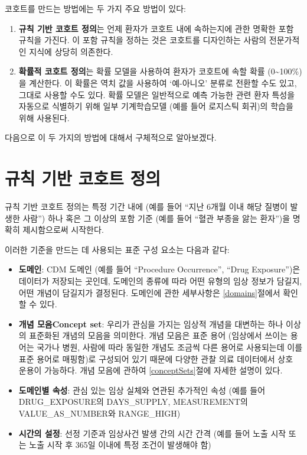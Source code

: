 \documentclass[10.5pt]{book}
\providecommand{\tightlist}{%
  \setlength{\itemsep}{0pt}\setlength{\parskip}{0pt}}
\theoremstyle{definition}
\theoremstyle{definition}
\theoremstyle{definition}
\theoremstyle{remark}
\begin{document}
코호트를 만드는 방법에는 두 가지 주요 방법이 있다:

\begin{enumerate}
\def\labelenumi{\arabic{enumi}.}
\tightlist
\item
  \textbf{규칙 기반 코호트 정의}는 언제 환자가 코호트 내에 속하는지에
  관한 명확한 포함 규칙을 가진다. 이 포함 규칙을 정하는 것은 코호트를
  디자인하는 사람의 전문가적인 지식에 상당히 의존한다.
\item
  \textbf{확률적 코호트 정의}는 확률 모델을 사용하여 환자가 코호트에
  속할 확률 (0\textasciitilde{}100\%)을 계산한다. 이 확률은 역치 값을
  사용하여 `예-아니오' 분류로 전환할 수도 있고, 그대로 사용할 수도 있다.
  확률 모델은 일반적으로 예측 가능한 관련 환자 특성을 자동으로 식별하기
  위해 일부 기계학습모델 (예를 들어 로지스틱 회귀)의 학습을 위해
  사용된다.
\end{enumerate}

다음으로 이 두 가지의 방법에 대해서 구체적으로 알아보겠다.

\section{규칙 기반 코호트 정의}\label{---}

규칙 기반 코호트 정의는 특정 기간 내에 (예를 들어 ``지난 6개월 이내 해당
질병이 발생한 사람'') 하나 혹은 그 이상의 포함 기준 (예를 들어 ``혈관
부종을 앓는 환자'')을 명확히 제시함으로써 시작한다.

이러한 기준을 만드는 데 사용되는 표준 구성 요소는 다음과 같다:

\begin{itemize}
\item
  \textbf{도메인}: CDM 도메인 (예를 들어 ``Procedure Occurrence'',
  ``Drug Exposure'')은 데이터가 저장되는 곳인데, 도메인의 종류에 따라
  어떤 유형의 임상 정보가 담길지, 어떤 개념이 담길지가 결정된다.
  도메인에 관한 세부사항은 \ref{domains}절에서 확인할 수 있다.
\item
  \textbf{개념 모음Concept set}: 우리가 관심을 가지는 임상적 개념을
  대변하는 하나 이상의 표준화된 개념의 모음을 의미한다. 개념 모음은 표준
  용어 (임상에서 쓰이는 용어는 국가나 병원, 사람에 따라 동일한 개념도
  조금씩 다른 용어로 사용되는데 이를 표준 용어로 매핑함)로 구성되어 있기
  때문에 다양한 관찰 의료 데이터에서 상호 운용이 가능하다. 개념 모음에
  관하여 \ref{conceptSets}절에 자세한 설명이 있다.
\item
  \textbf{도메인별 속성}: 관심 있는 임상 실체와 연관된 추가적인 속성
  (예를 들어 DRUG\_EXPOSURE의 DAYS\_SUPPLY, MEASUREMENT의
  VALUE\_AS\_NUMBER와 RANGE\_HIGH)
\item
  \textbf{시간의 설정}: 선정 기준과 임상사건 발생 간의 시간 간격 (예를
  들어 노출 시작 또는 노출 시작 후 365일 이내에 특정 조건이 발생해야 함)
\end{itemize}
\end{document}
